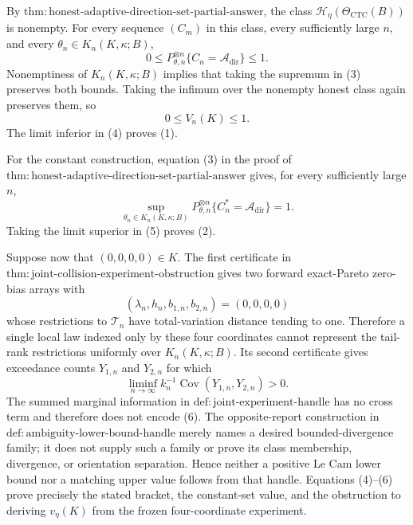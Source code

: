By \(\mathrm{thm{:}honest\text{-}adaptive\text{-}direction\text{-}set\text{-}partial\text{-}answer}\), the class \(\mathcal H_\eta(\Theta_{\mathrm{CTC}}(B))\) is nonempty.  For every sequence \((C_m)\) in this class, every sufficiently large \(n\), and every \(\theta_n\in K_n(K,\kappa;B)\),
\[
 0\leq P_{\theta,n}^{\otimes n}\{C_n=\mathcal A_{\mathrm{dir}}\}\leq1. \tag{3}
\]
Nonemptiness of \(K_n(K,\kappa;B)\) implies that taking the supremum in (3) preserves both bounds.  Taking the infimum over the nonempty honest class again preserves them, so
\[
 0\leq V_n(K)\leq1. \tag{4}
\]
The limit inferior in (4) proves (1).

For the constant construction, equation (3) in the proof of \(\mathrm{thm{:}honest\text{-}adaptive\text{-}direction\text{-}set\text{-}partial\text{-}answer}\) gives, for every sufficiently large \(n\),
\[
 \sup_{\theta_n\in K_n(K,\kappa;B)}
 P_{\theta,n}^{\otimes n}\{C_n^*=\mathcal A_{\mathrm{dir}}\}=1. \tag{5}
\]
Taking the limit superior in (5) proves (2).

Suppose now that \((0,0,0,0)\in K\).  The first certificate in \(\mathrm{thm{:}joint\text{-}collision\text{-}experiment\text{-}obstruction}\) gives two forward exact-Pareto zero-bias arrays with
\[
 (\lambda_n,h_n,b_{1,n},b_{2,n})=(0,0,0,0)
\]
whose restrictions to \(\mathcal T_n\) have total-variation distance tending to one.  Therefore a single local law indexed only by these four coordinates cannot represent the tail-rank restrictions uniformly over \(K_n(K,\kappa;B)\).  Its second certificate gives exceedance counts \(Y_{1,n}\) and \(Y_{2,n}\) for which
\[
 \liminf_{n\to\infty}k_n^{-1}\operatorname{Cov}(Y_{1,n},Y_{2,n})>0. \tag{6}
\]
The summed marginal information in \(\mathrm{def{:}joint\text{-}experiment\text{-}handle}\) has no cross term and therefore does not encode (6).  The opposite-report construction in \(\mathrm{def{:}ambiguity\text{-}lower\text{-}bound\text{-}handle}\) merely names a desired bounded-divergence family; it does not supply such a family or prove its class membership, divergence, or orientation separation.  Hence neither a positive Le Cam lower bound nor a matching upper value follows from that handle.  Equations (4)--(6) prove precisely the stated bracket, the constant-set value, and the obstruction to deriving \(v_\eta(K)\) from the frozen four-coordinate experiment.
